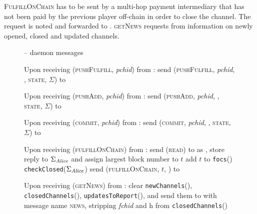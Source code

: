   \textsc{FulfillOnChain} has to be sent by a multi-hop payment intermediary
  that has not been paid by the previous player off-chain in order to close the
  channel. The request is noted and forwarded to \simulator. \textsc{getNews}
  requests from \fpaynet{} information on newly opened, closed and updated
  channels.

  \begin{figure}[H]
    \begin{systembox}{\fpaynet{} -- daemon messages}
      \begin{algorithmic}[1]
        \State Upon receiving (\textsc{pushFulfill}, \textit{pchid}) from
        \alice:
        \Indent
          \State send (\textsc{pushFulfill}, \textit{pchid}, \alice,
          \textsc{state}, $\Sigma$) to \simulator
          \label{alg:fpaynet:daemon:fulfill}
        \EndIndent
        \Statex

        \State Upon receiving (\textsc{pushAdd}, \textit{pchid}) from \alice:
        \Indent
          \State send (\textsc{pushAdd}, \textit{pchid}, \alice, \textsc{state},
          $\Sigma$) to \simulator
          \label{alg:fpaynet:daemon:add}
        \EndIndent
        \Statex

        \State Upon receiving (\textsc{commit}, \textit{pchid}) from \alice:
        \Indent
          \State send (\textsc{commit}, \textit{pchid}, \alice, \textsc{state},
          $\Sigma$) to \simulator
          \label{alg:fpaynet:daemon:commit}
        \EndIndent
        \Statex

        \State Upon receiving (\textsc{fulfillOnChain}) from \alice:
        \Indent
          \State send (\textsc{read}) to \ledger{} as \alice{}, store reply to
          $\Sigma_{\mathit{Alice}}$ and assign largest block number to $t$
          \label{alg:fpaynet:daemon:foc:read}
          \State add $t$ to \texttt{focs}(\alice)
          \State \texttt{checkClosed}($\Sigma_{\mathit{Alice}}$)
          \State send (\textsc{fulfillOnChain}, $t$, \alice) to \simulator
        \EndIndent
        \Statex

        \State Upon receiving (\textsc{getNews}) from \alice:
        \label{alg:fpaynet:getnews}
        \Indent
          \State clear \texttt{newChannels}(\alice),
          \texttt{closedChannels}(\alice), \texttt{updatesToReport}(\alice),
           and send them to \alice{}
          with message name \textsc{news}, stripping \textit{fchid} and h from
          \texttt{closedChannels}(\alice)
          \label{alg:fpaynet:getnews:send}
        \EndIndent
      \end{algorithmic}
    \end{systembox}
    \caption{}
    \label{alg:fpaynet:daemon}
  \end{figure}

